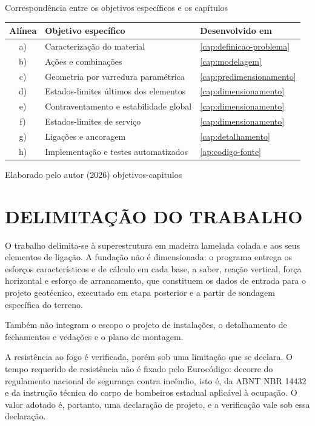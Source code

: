 \tabela
{Correspondência entre os objetivos específicos e os capítulos}
{\footnotesize
\begin{tabular}{cp{8.6cm}l}
\toprule
    \textbf{Alínea} & \textbf{Objetivo específico} & \textbf{Desenvolvido em} \\
\midrule
    a) & Caracterização do material              & \autoref{cap:definicao-problema} \\
    b) & Ações e combinações                     & \autoref{cap:modelagem} \\
    c) & Geometria por varredura paramétrica     & \autoref{cap:predimensionamento} \\
    d) & Estados-limites últimos dos elementos   & \autoref{cap:dimensionamento} \\
    e) & Contraventamento e estabilidade global  & \autoref{cap:dimensionamento} \\
    f) & Estados-limites de serviço              & \autoref{cap:dimensionamento} \\
    g) & Ligações e ancoragem                    & \autoref{cap:detalhamento} \\
    h) & Implementação e testes automatizados    & \autoref{ap:codigo-fonte} \\
\bottomrule
\end{tabular}}
{Elaborado pelo autor (2026)}
{objetivos-capitulos}
{}
{}

\section{DELIMITAÇÃO DO TRABALHO}\label{sec:delimitacao}

O trabalho delimita-se à superestrutura em madeira lamelada colada e aos seus
elementos de ligação. A fundação não é dimensionada: o programa entrega os
esforços característicos e de cálculo em cada base, a saber, reação vertical,
força horizontal e esforço de arrancamento, que constituem os dados de entrada
para o projeto geotécnico, executado em etapa posterior e a partir de sondagem
específica do terreno.

Também não integram o escopo o projeto de instalações, o detalhamento de
fechamentos e vedações e o plano de montagem.

A resistência ao fogo é verificada, porém sob uma limitação que se declara. O
tempo requerido de resistência não é fixado pelo Eurocódigo: decorre do
regulamento nacional de segurança contra incêndio, isto é, da
ABNT NBR 14432 \cite{NBR14432:2001} e da instrução técnica do corpo de bombeiros estadual
aplicável à ocupação. O valor adotado é, portanto, uma declaração de projeto, e
a verificação vale sob essa declaração.

